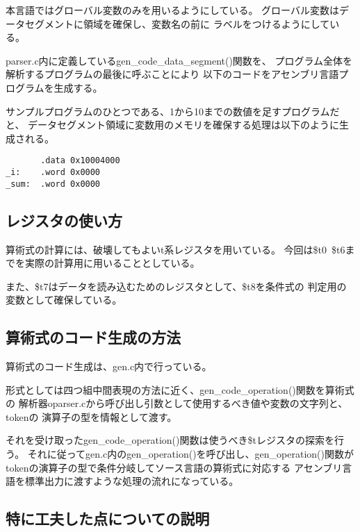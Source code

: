 \documentclass[11pt,a4j]{jarticle}
\begin{document}

本言語ではグローバル変数のみを用いるようにしている。
グローバル変数はデータセグメントに領域を確保し、変数名の前に
ラベルをつけるようにしている。

parser.c内に定義しているgen\_code\_data\_segment()関数を、
プログラム全体を解析するプログラムの最後に呼ぶことにより
以下のコードをアセンブリ言語プログラムを生成する。

サンプルプログラムのひとつである、1から10までの数値を足すプログラムだと、
データセグメント領域に変数用のメモリを確保する処理は以下のように生成される。

\begin{verbatim}
       .data 0x10004000
_i:    .word 0x0000
_sum:  .word 0x0000
\end{verbatim}




\subsection{レジスタの使い方}


算術式の計算には、破壊してもよいt系レジスタを用いている。
今回は\$t0~\$t6までを実際の計算用に用いることとしている。

また、\$t7はデータを読み込むためのレジスタとして、\$t8を条件式の
判定用の変数として確保している。


\subsection{算術式のコード生成の方法}

算術式のコード生成は、gen.c内で行っている。

形式としては四つ組中間表現の方法に近く、gen\_code\_operation()関数を算術式の
解析器oparser.cから呼び出し引数として使用するべき値や変数の文字列と、tokenの
演算子の型を情報として渡す。

それを受け取ったgen\_code\_operation()関数は使うべき\$tレジスタの探索を行う。
それに従ってgen.c内のgen\_operation()を呼び出し、gen\_operation()関数が
tokenの演算子の型で条件分岐してソース言語の算術式に対応する
アセンブリ言語を標準出力に渡すような処理の流れになっている。



\subsection{特に工夫した点についての説明}
\end{document}
